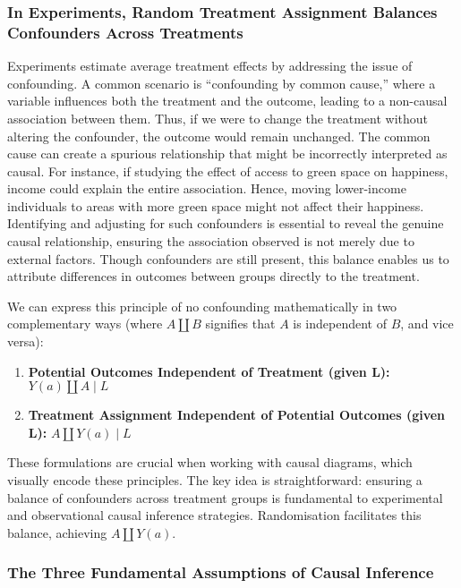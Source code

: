 \documentclass[
  singlecolumn]{article}
\providecommand{\tightlist}{%
  \setlength{\itemsep}{0pt}\setlength{\parskip}{0pt}}\usepackage{longtable,booktabs,array}
\begin{document}
\subsubsection{In Experiments, Random Treatment Assignment Balances
Confounders Across
Treatments}\label{in-experiments-random-treatment-assignment-balances-confounders-across-treatments}

Experiments estimate average treatment effects by addressing the issue
of confounding. A common scenario is ``confounding by common cause,''
where a variable influences both the treatment and the outcome, leading
to a non-causal association between them. Thus, if we were to change the
treatment without altering the confounder, the outcome would remain
unchanged. The common cause can create a spurious relationship that
might be incorrectly interpreted as causal. For instance, if studying
the effect of access to green space on happiness, income could explain
the entire association. Hence, moving lower-income individuals to areas
with more green space might not affect their happiness. Identifying and
adjusting for such confounders is essential to reveal the genuine causal
relationship, ensuring the association observed is not merely due to
external factors. Though confounders are still present, this balance
enables us to attribute differences in outcomes between groups directly
to the treatment.

We can express this principle of no confounding mathematically in two
complementary ways (where \(A \coprod B\) signifies that \(A\) is
independent of \(B\), and vice versa):

\begin{enumerate}
\def\labelenumi{\arabic{enumi}.}
\tightlist
\item
  \textbf{Potential Outcomes Independent of Treatment (given L):}
  \(Y(a) \coprod A \mid L\)
\item
  \textbf{Treatment Assignment Independent of Potential Outcomes (given
  L):} \(A \coprod Y(a) \mid L\)
\end{enumerate}

These formulations are crucial when working with causal diagrams, which
visually encode these principles. The key idea is straightforward:
ensuring a balance of confounders across treatment groups is fundamental
to experimental and observational causal inference strategies.
Randomisation facilitates this balance, achieving \(A \coprod Y(a)\).

\subsubsection{The Three Fundamental Assumptions of Causal
Inference}\label{sec-three-fundamental-assumptions}
\end{document}
